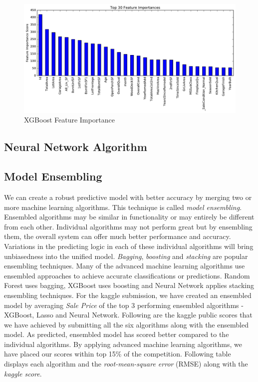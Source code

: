 \documentclass[sigconf]{acmart}
\begin{document}
	
	\begin{figure}[H]
		\centering
		\includegraphics[width=0.75\columnwidth]{images/xgboost_feature_importance}	
		\caption{XGBoost Feature Importance} \label{fig:xgb_feature_imp} 
	\end{figure}
	
	
	\subsection{Neural Network Algorithm}
	
	\subsection{Model Ensembling}
	We can create a robust predictive model with better accuracy by merging two or more machine learning algorithms. This technique is called {\em model ensembling}. Ensembled algorithms may be similar in functionality or may entirely be different from each other. Individual algorithms may not perform great but by ensembling them, the overall system can offer much better performance and accuracy. Variations in the predicting logic in each of these individual algorithms will bring unbiasedness into the unified model. {\em Bagging}, {\em boosting} and {\em stacking} are popular ensembling techniques. Many of the advanced machine learning algorithms use ensembled approaches to achieve accurate classifications or predictions. Random Forest uses bagging, XGBoost uses boosting and Neural Network applies stacking ensembling techniques. For the kaggle submission, we have created an ensembled model by averaging {\em Sale Price} of the top 3 performing ensembled algorithms - XGBoost, Lasso and Neural Network.  Following are the kaggle public scores that we have achieved by submitting all the six algorithms along with the ensembled model. As predicted, ensembled model has scored better compared to the individual algorithms. By applying advanced machine learning algorithms, we have placed our scores within top 15\% of the competition. Following table displays each algorithm and the {\em root-mean-square error} (RMSE) along with the {\em kaggle score}.
	
\end{document}
